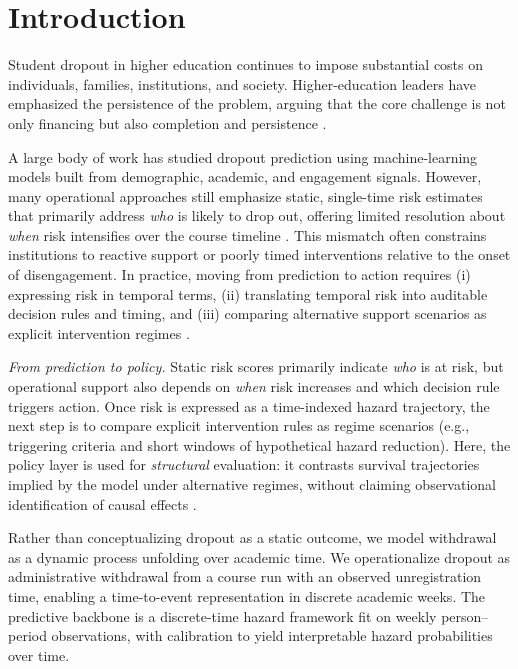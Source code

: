 \section{Introduction}

Student dropout in higher education continues to impose substantial costs on individuals, families, institutions, and society. Higher-education leaders have emphasized the persistence of the problem, arguing that the core challenge is not only financing but also completion and persistence \cite{Crow2023CompletionCrisis,Shapiro2023SomeCollegeNoCredential}.

A large body of work has studied dropout prediction using machine-learning models built from demographic, academic, and engagement signals. However, many operational approaches still emphasize static, single-time risk estimates that primarily address \emph{who} is likely to drop out, offering limited resolution about \emph{when} risk intensifies over the course timeline \cite{Prenkaj2021SurveyMLDropout,AndradeGiron2023DropoutMLReview}. This mismatch often constrains institutions to reactive support or poorly timed interventions relative to the onset of disengagement. In practice, moving from prediction to action requires (i) expressing risk in temporal terms, (ii) translating temporal risk into auditable decision rules and timing, and (iii) comparing alternative support scenarios as explicit intervention regimes \cite{McmahonSembiante2020MeaningfulIntervention,Ortigosa2019LabToProductionEWS,Plak2021StudentCounsellingEWS}.

\noindent\textit{From prediction to policy.}
Static risk scores primarily indicate \emph{who} is at risk, but operational support also depends on \emph{when} risk increases and which decision rule triggers action. Once risk is expressed as a time-indexed hazard trajectory, the next step is to compare explicit intervention rules as regime scenarios (e.g., triggering criteria and short windows of hypothetical hazard reduction). Here, the policy layer is used for \emph{structural} evaluation: it contrasts survival trajectories implied by the model under alternative regimes, without claiming observational identification of causal effects \cite{Igelstrom2022CausalInferenceObs,DoutreligneVaroquaux2025PredictiveDecisionCausal}.

Rather than conceptualizing dropout as a static outcome, we model withdrawal as a dynamic process unfolding over academic time. We operationalize dropout as administrative withdrawal from a course run with an observed unregistration time, enabling a time-to-event representation in discrete academic weeks. The predictive backbone is a discrete-time hazard framework fit on weekly person--period observations, with calibration to yield interpretable hazard probabilities over time.

